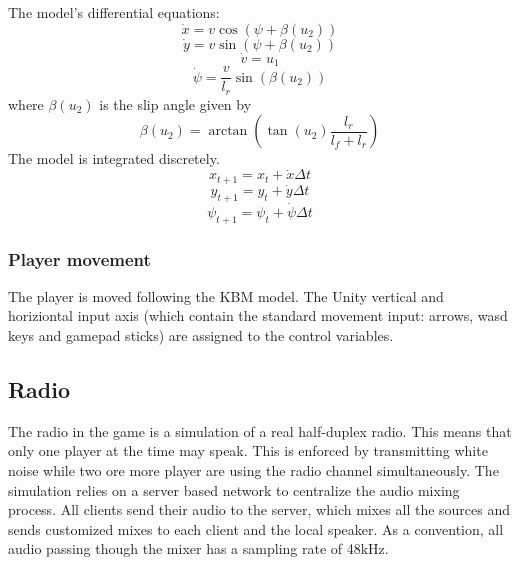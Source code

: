 \documentclass[12pt]{article}
\begin{document}
The model's differential equations:
\begin{equation}\dot{x} = v \cos(\psi + \beta (u_2)) \end{equation}
\begin{equation}\dot{y} = v \sin(\psi + \beta (u_2)) \end{equation}
\begin{equation}\dot{v} = u_1 \end{equation}
\begin{equation}\dot{\psi} = \frac{v} {l_r} \sin(\beta(u_2)) \end{equation}
\medskip
where \( \beta(u_2) \) is the slip angle given by
\begin{equation} \beta(u_2) = \arctan (\tan(u_2) \frac{l_r} { l_f + l_r })  \end{equation}
\bigskip
The model is integrated discretely.
\begin{equation} x_{t+1} = x_t + \dot{x}\Delta t \end{equation}
\begin{equation} y_{t+1} = y_t + \dot{y}\Delta t \end{equation}
\begin{equation} {\psi}_{t+1} = {\psi}_t + \dot{\psi}\Delta t\end{equation}

\bigskip

\subsubsection{Player movement}
The player is moved following the KBM model. The Unity vertical and horiziontal input axis (which contain the standard movement input: arrows, wasd keys and gamepad sticks) are assigned to the control variables. 

\clearpage


\subsection{Radio}
The radio in the game is a simulation of a real half-duplex radio. This means that only one player at the time may speak. This is enforced by transmitting white noise while two ore more player are using the radio channel simultaneously. The simulation relies on a server based network to centralize the audio mixing process. All clients send their audio to the server, which mixes all the sources and sends customized mixes to each client and the local speaker. As a convention, all audio passing though the mixer has a sampling rate of 48kHz. 
\end{document}
